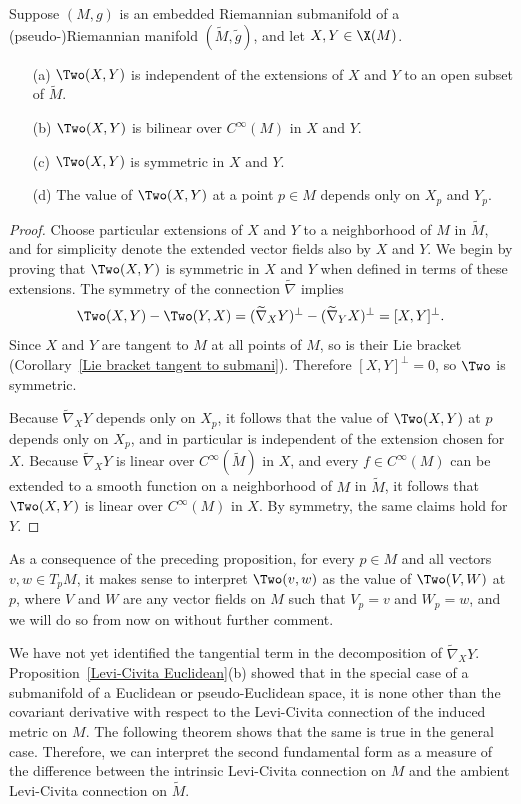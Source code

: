 \begin{proposition}\label{Riemann second form prop}
Suppose $(M,g)$ is an embedded Riemannian submanifold of a (pseudo-)Riemannian manifold $(\widetilde{M},\tilde{g})$, and let $X,Y\in\X(M)$.
\begin{itemize}
\item[(a)] $\Two(X,Y)$ is independent of the extensions of $X$ and $Y$ to an open subset of $\widetilde{M}$.
\item[(b)] $\Two(X,Y)$ is bilinear over $C^\infty(M)$ in $X$ and $Y$.
\item[(c)] $\Two(X,Y)$ is symmetric in $X$ and $Y$.
\item[(d)] The value of $\Two(X,Y)$ at a point $p\in M$ depends only on $X_p$ and $Y_p$.
\end{itemize}
\end{proposition}
\begin{proof}
Choose particular extensions of $X$ and $Y$ to a neighborhood of $M$ in $\widetilde{M}$, and for simplicity denote the extended vector fields also by $X$ and $Y$. We begin by proving that $\Two(X,Y)$ is symmetric in $X$ and $Y$ when defined in terms of these extensions. The symmetry of the connection $\widetilde{\nabla}$ implies
\[\Two(X,Y)-\Two(Y,X)=(\widetilde{\nabla}_XY)^\bot-(\widetilde{\nabla}_YX)^\bot=[X,Y]^\bot.\]
Since $X$ and $Y$ are tangent to $M$ at all points of $M$, so is their Lie bracket (Corollary~\ref{Lie bracket tangent to submani}). Therefore $[X,Y]^\bot=0$, so $\Two$ is symmetric.\par
Because $\widetilde{\nabla}_XY$ depends only on $X_p$, it follows that the value of $\Two(X,Y)$ at $p$ depends only on $X_p$, and in particular is independent of the extension chosen for $X$. Because $\widetilde{\nabla}_XY$ is linear over $C^\infty(\widetilde{M})$ in $X$, and every $f\in C^\infty(M)$ can be extended to a smooth function on a neighborhood of $M$ in $\widetilde{M}$, it follows that $\Two(X,Y)$ is linear over $C^\infty(M)$ in $X$. By symmetry, the same claims hold for $Y$.
\end{proof}
As a consequence of the preceding proposition, for every $p\in M$ and all vectors $v,w\in T_pM$, it makes sense to interpret $\Two(v,w)$ as the value of $\Two(V,W)$ at $p$, where $V$ and $W$ are any vector fields on $M$ such that $V_p=v$ and $W_p=w$, and we will do so from now on without further comment.\par
We have not yet identified the tangential term in the decomposition of $\widetilde{\nabla}_XY$. Proposition~\ref{Levi-Civita Euclidean}(b) showed that in the special case of a submanifold of a Euclidean or pseudo-Euclidean space, it is none other than the covariant derivative with respect to the Levi-Civita connection of the induced metric on $M$. The following theorem shows that the same is true in the general case. Therefore, we can interpret the second fundamental form as a measure of the difference between the intrinsic Levi-Civita connection on $M$ and the ambient Levi-Civita connection on $\widetilde{M}$.
